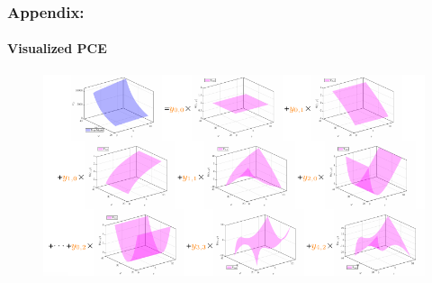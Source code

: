 \begin{frame}
\frametitle{Appendix:}
\framesubtitle{Visualized PCE}
\begin{figure}[ht]
    \includegraphics[width = 130mm]{figures/figure-PCE_visualize.pdf}
\end{figure}
\end{frame}